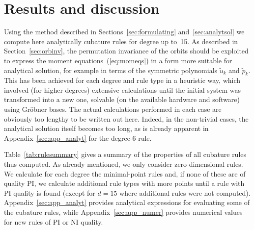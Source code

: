 \documentclass{article}
\begin{document}
\section{Results and discussion}
\label{sec:results}

Using the method described in Sections~\ref{sec:formulating} and~\ref{sec:analytsol} we compute here analytically cubature rules for degree up to~15. As described in Section~\ref{sec:orbinv}, the permutation invariance of the orbits should be exploited to express the moment equations~(\ref{eq:momeqs}) in a form more suitable for analytical solution, for example in terms of the symmetric polynomials $\tilde{u}_k$ and $\tilde{p}_k$. This has been achieved for each degree and rule type in a heuristic way, which involved (for higher degrees) extensive calculations until the initial system was transformed into a new one, solvable (on the available hardware and software) using Gr\"obner bases. The actual calculations performed in each case are obviously too lengthy to be written out here. Indeed, in the non-trivial cases, the analytical solution itself becomes too long, as is already apparent in Appendix~\ref{sec:app_analyt} for the degree-6 rule.

Table~\ref{tab:rulesummary} gives a summary of the properties of all cubature rules thus computed. As already mentioned, we only consider zero-dimensional rules. We calculate for each degree the minimal-point rules and, if none of these are of quality PI, we calculate additional rule types with more points until a rule with PI quality is found (except for $d=15$ where additional rules were not computed). Appendix~\ref{sec:app_analyt} provides analytical expressions for evaluating some of the cubature rules, while Appendix~\ref{sec:app_numer} provides numerical values for new rules of PI or NI quality.
\end{document}
